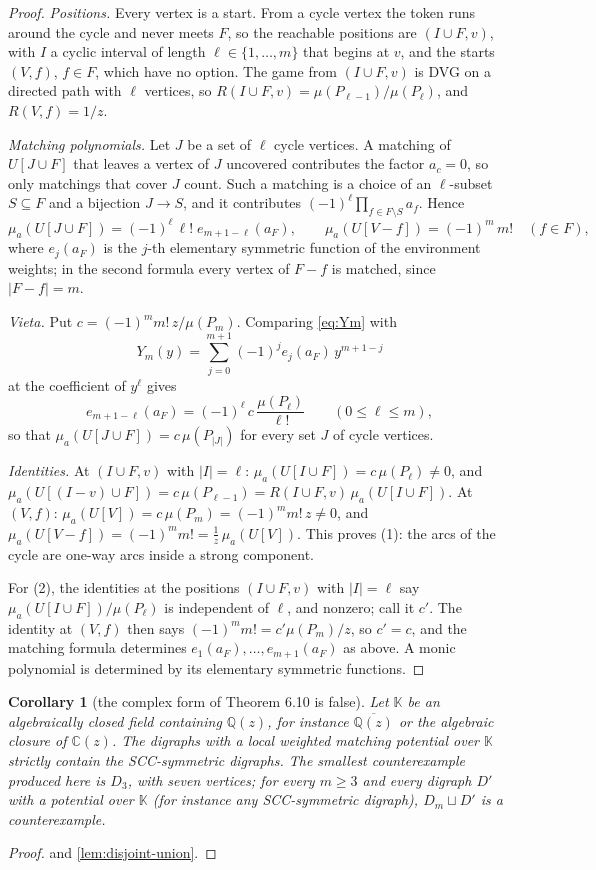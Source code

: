 \documentclass[11pt]{amsart}
\theoremstyle{plain}
\newtheorem{corollary}[theorem]{Corollary}
\theoremstyle{definition}
\theoremstyle{remark}
\numberwithin{equation}{section}
\newcommand{\QQ}{\mathbb{Q}}
\newcommand{\CC}{\mathbb{C}}
\newcommand{\Qz}{\QQ(z)}
\newcommand{\Qzbar}{\overline{\QQ(z)}}
\begin{document}
\begin{proof}
\emph{Positions.} Every vertex is a start. From a cycle vertex the token runs around the cycle and never meets $F$, so the reachable positions are $(I\cup F,v)$, with $I$ a cyclic interval of length $\ell\in\{1,\dots,m\}$ that begins at $v$, and the starts $(V,f)$, $f\in F$, which have no option. The game from $(I\cup F,v)$ is DVG on a directed path with $\ell$ vertices, so $R(I\cup F,v)=\mu(P_{\ell-1})/\mu(P_\ell)$, and $R(V,f)=1/z$.

\emph{Matching polynomials.} Let $J$ be a set of $\ell$ cycle vertices. A matching of $U[J\cup F]$ that leaves a vertex of $J$ uncovered contributes the factor $a_c=0$, so only matchings that cover $J$ count. Such a matching is a choice of an $\ell$-subset $S\subseteq F$ and a bijection $J\to S$, and it contributes $(-1)^{\ell}\prod_{f\in F\setminus S}a_f$. Hence
\[
\mu_a(U[J\cup F])=(-1)^{\ell}\,\ell!\;e_{m+1-\ell}(a_F),\qquad \mu_a(U[V-f])=(-1)^{m}\,m!\quad(f\in F),
\]
where $e_j(a_F)$ is the $j$-th elementary symmetric function of the environment weights; in the second formula every vertex of $F-f$ is matched, since $|F-f|=m$.

\emph{Vieta.} Put $c=(-1)^{m}m!\,z/\mu(P_m)$. Comparing \eqref{eq:Ym} with
\[
Y_m(y)=\sum_{j=0}^{m+1}(-1)^{j}e_j(a_F)\,y^{m+1-j}
\]
at the coefficient of $y^{\ell}$ gives
\[
e_{m+1-\ell}(a_F)=(-1)^{\ell}\,c\,\frac{\mu(P_\ell)}{\ell!}\qquad(0\le\ell\le m),
\]
so that $\mu_a(U[J\cup F])=c\,\mu(P_{|J|})$ for every set $J$ of cycle vertices.

\emph{Identities.} At $(I\cup F,v)$ with $|I|=\ell$: $\mu_a(U[I\cup F])=c\,\mu(P_\ell)\neq0$, and $\mu_a(U[(I-v)\cup F])=c\,\mu(P_{\ell-1})=R(I\cup F,v)\,\mu_a(U[I\cup F])$. At $(V,f)$: $\mu_a(U[V])=c\,\mu(P_m)=(-1)^{m}m!\,z\neq0$, and $\mu_a(U[V-f])=(-1)^{m}m!=\frac1z\,\mu_a(U[V])$. This proves (1): the arcs of the cycle are one-way arcs inside a strong component.

For (2), the identities at the positions $(I\cup F,v)$ with $|I|=\ell$ say $\mu_a(U[I\cup F])/\mu(P_\ell)$ is independent of $\ell$, and nonzero; call it $c'$. The identity at $(V,f)$ then says $(-1)^{m}m!=c'\mu(P_m)/z$, so $c'=c$, and the matching formula determines $e_1(a_F),\dots,e_{m+1}(a_F)$ as above. A monic polynomial is determined by its elementary symmetric functions.
\end{proof}

\begin{corollary}[the complex form of Theorem 6.10 is false]\label{cor:complex-false}
Let $\mathbb K$ be an algebraically closed field containing $\Qz$, for instance $\Qzbar$ or the algebraic closure of $\CC(z)$. The digraphs with a local weighted matching potential over $\mathbb K$ strictly contain the SCC-symmetric digraphs. The smallest counterexample produced here is $D_3$, with seven vertices; for every $m\ge3$ and every digraph $D'$ with a potential over $\mathbb K$ (for instance any SCC-symmetric digraph), $D_m\sqcup D'$ is a counterexample.
\end{corollary}
\begin{proof}
 and \cref{lem:disjoint-union}.
\end{proof}
\end{document}
